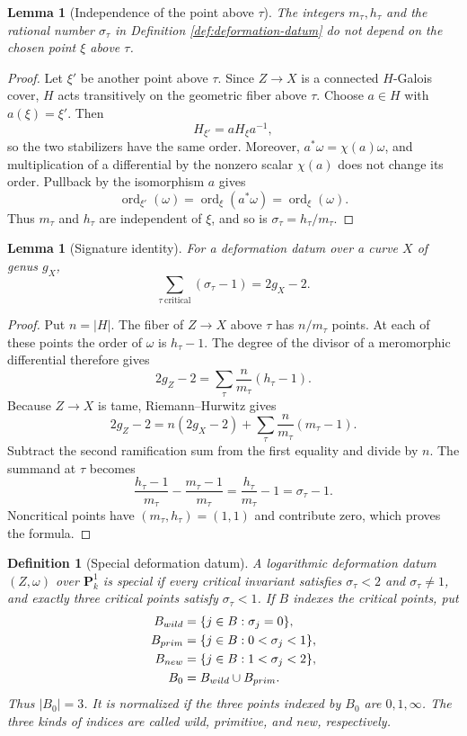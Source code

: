 \documentclass[10pt,a4paper]{amsart}
\newtheorem{lemma}[theorem]{Lemma}
\newtheorem{definition}[theorem]{Definition}
\numberwithin{equation}{section}
\begin{document}
\begin{lemma}[Independence of the point above $\tau$]
\label{lem:deformation-invariants}
The integers $m_\tau,h_\tau$ and the rational number $\sigma_\tau$ in
Definition \ref{def:deformation-datum} do not depend on the chosen point
$\xi$ above $\tau$.
\end{lemma}

\begin{proof}
Let $\xi'$ be another point above $\tau$.  Since $Z\to X$ is a connected
$H$-Galois cover, $H$ acts transitively on the geometric fiber above
$\tau$.  Choose $a\in H$ with $a(\xi)=\xi'$.  Then
\[
 H_{\xi'}=aH_\xi a^{-1},
\]
so the two stabilizers have the same order.  Moreover,
$a^*\omega=\chi(a)\omega$, and multiplication of a differential by the
nonzero scalar $\chi(a)$ does not change its order.  Pullback by the
isomorphism $a$ gives
\[
 \operatorname{ord}_{\xi'}(\omega)
 =\operatorname{ord}_{\xi}(a^*\omega)
 =\operatorname{ord}_{\xi}(\omega).
\]
Thus $m_\tau$ and $h_\tau$ are independent of $\xi$, and so is
$\sigma_\tau=h_\tau/m_\tau$.
\end{proof}

\begin{lemma}[Signature identity]\label{lem:signature-identity}
For a deformation datum over a curve $X$ of genus $g_X$,
\[
 \sum_{\tau\ \mathrm{critical}}(\sigma_\tau-1)=2g_X-2.
\]
\end{lemma}

\begin{proof}
Put $n=|H|$.  The fiber of $Z\to X$ above $\tau$ has $n/m_\tau$ points.
At each of these points the order of $\omega$ is $h_\tau-1$.  The degree of
the divisor of a meromorphic differential therefore gives
\[
 2g_Z-2=\sum_\tau\frac{n}{m_\tau}(h_\tau-1).
\]
Because $Z\to X$ is tame, Riemann--Hurwitz gives
\[
 2g_Z-2=n(2g_X-2)
 +\sum_\tau\frac{n}{m_\tau}(m_\tau-1).
\]
Subtract the second ramification sum from the first equality and divide by
$n$.  The summand at $\tau$ becomes
\[
 \frac{h_\tau-1}{m_\tau}-\frac{m_\tau-1}{m_\tau}
 =\frac{h_\tau}{m_\tau}-1=\sigma_\tau-1.
\]
Noncritical points have $(m_\tau,h_\tau)=(1,1)$ and contribute zero, which
proves the formula.
\end{proof}

\begin{definition}[Special deformation datum]\label{def:special-datum}
A logarithmic deformation datum $(Z,\omega)$ over $\mathbf P^1_k$ is
special if every critical invariant satisfies $\sigma_\tau<2$ and
$\sigma_\tau\ne1$, and exactly three critical points satisfy
$\sigma_\tau<1$.  If $B$ indexes the critical points, put
\[
 \begin{aligned}
 B_{\rm wild}&=\{j\in B:\sigma_j=0\},\\
 B_{\rm prim}&=\{j\in B:0<\sigma_j<1\},\\
 B_{\rm new}&=\{j\in B:1<\sigma_j<2\},\\
 B_0&=B_{\rm wild}\cup B_{\rm prim}.
 \end{aligned}
\]
Thus $|B_0|=3$.  It is normalized if the three points indexed by $B_0$ are
$0,1,\infty$.  The three kinds of indices are called wild, primitive, and
new, respectively.
\end{definition}
\end{document}
